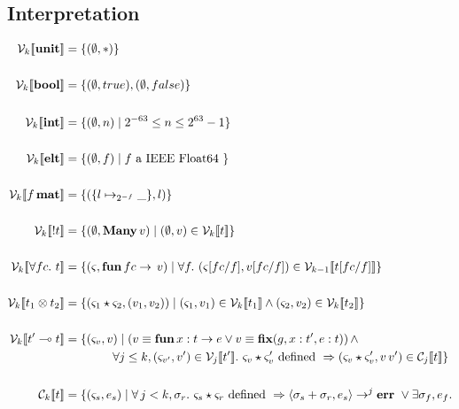 \subsection{Interpretation}


\begin{align*}
  \V{k}{ \Unit } &= \{ (\empH, \ast) \} \\
\\
    \V{k}{ \Bool } &= \{ (\empH, true), (\empH, false) \} \\
\\
    \V{k}{ \Int } &= \{ (\empH, n) \mid 2^{-63} \leq n \leq 2^{63} -1 \} \\
\\
    \V{k}{ \Elt } &= \{ (\empH, f) \mid f \textrm{ a IEEE Float64 } \} \\
\\
    \V{k}{ f \, \Mat } &= \{ (\{ l \mapsto_{2^{-f}} \_ \} , l) \} \\
\\
    \V{k}{ \Bang t } &= \{ (\empH, \Many\, v) \mid (\empH, v) \in \V{k}{t} \} \\
\\
    \V{k}{ \forall fc.\  t } &= \{ (\varsigma, \ottkw{fun}\, fc \rightarrow \, v) \mid \forall f.\ (\varsigma [ fc / f ], v [ fc / f ]) \in \V{k-1}{ t [ fc / f ] } \} \\
\\
    \V{k}{ t_1 \otimes t_2 } &= \{ (\varsigma_1 \star \varsigma_2, ( v_1, v_2 )) \mid (\varsigma_1, v_1) \in \V{k}{t_1} \wedge (\varsigma_2, v_2) \in \V{k}{t_2} \} \\
\\
    \V{k}{ t' \multimap t } &= \{ (\varsigma_v, v ) \mid ( v \equiv \ottkw{fun}\, x : t \rightarrow e \vee v \equiv \ottkw{fix} (g, x : t' , e : t) ) \, \wedge\\
                            & \qquad \qquad \forall j \leq k, (\varsigma_{v'}, v') \in \V{j}{ t' }.\ \varsigma_v \star \varsigma_v' \textrm{ defined } \Rightarrow (\varsigma_v \star \varsigma_v', v\, v') \in \C{j}{t} \} \\
\\
    \C{k}{ t } &= \{ (\varsigma_s, e_s) \mid \forall \, j < k, \sigma_r.\ \varsigma_s \star \varsigma_r \textrm{ defined } \Rightarrow \langle \sigma_s + \sigma_r, e_s \rangle \rightarrow^j \ottkw{err}\ \vee \exists \sigma_f, e_f.\\

\end{align*}
